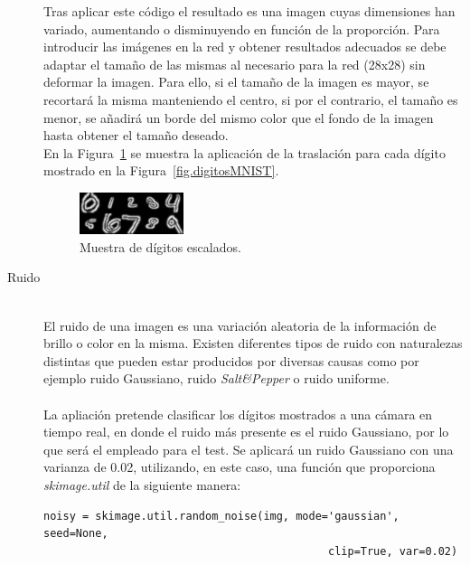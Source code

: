 \begin{description}
	Tras aplicar este código el resultado es una imagen cuyas dimensiones han variado, aumentando o disminuyendo en función de la proporción. Para introducir las imágenes en la red y obtener resultados adecuados se debe adaptar el tamaño de las mismas al necesario para la red (28x28) sin deformar la imagen. Para ello, si el tamaño de la imagen es mayor, se recortará la misma manteniendo el centro, si por el contrario, el tamaño es menor, se añadirá un borde del mismo color que el fondo de la imagen hasta obtener el tamaño deseado.
	\vspace{10pt}
	\\
	En la Figura~\ref{fig.escalado} se muestra la aplicación de la traslación para cada dígito mostrado en la Figura~\ref{fig.digitosMNIST}.
	\begin{figure}[H]
		\begin{center}
			\includegraphics[width=0.3\textwidth]{figures/escala}
			\caption{Muestra de dígitos escalados.}
			\label{fig.escalado}
		\end{center}
	\end{figure}
	\item[Ruido] \hfill 
	\vspace{10pt}
	\\
	El ruido de una imagen es una variación aleatoria de la información de brillo o color en la misma. Existen diferentes tipos de ruido con naturalezas distintas que pueden estar producidos por diversas causas como por ejemplo ruido Gaussiano, ruido \textit{Salt\&Pepper} o ruido uniforme.\\
	\vspace{-10pt}
	\\
	La apliación pretende clasificar los dígitos mostrados a una cámara en tiempo real, en donde el ruido más presente es el ruido Gaussiano, por lo que será el empleado para el test. Se aplicará un ruido Gaussiano con  una varianza de 0.02, utilizando, en este caso, una función que proporciona \textit{skimage.util} de la siguiente manera:
	\vspace{10pt}
	\begin{lstlisting}[frame=single]
	noisy = skimage.util.random_noise(img, mode='gaussian', seed=None, 
											clip=True, var=0.02)
	\end{lstlisting}
	

\end{description}
